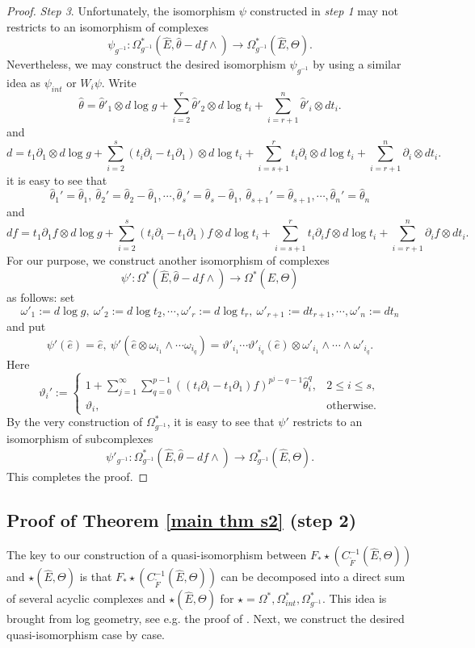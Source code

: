 \documentclass[12pt, a4paper]{article}
\begin{document}
\begin{proof}
\emph{Step 3}. Unfortunately, the isomorphism $\psi$ constructed in \emph{step 1} may not restricts to an isomorphism of complexes 
$$\psi_{g^{-1}}:\Omega^*_{g^{-1}}(\hat E,\hat\theta-df\wedge)\to\Omega^*_{g^{-1}}(\hat E,\Theta).$$
Nevertheless, we may construct the desired isomorphism $\psi_{g^{-1}}$ by using a similar idea as $\psi_{int}$ or $W_i\psi$. Write
$$
\hat\theta=\hat\theta'_1\otimes d\log g+\sum_{i=2}^r\hat\theta'_2\otimes d\log t_i+\sum_{i=r+1}^n\hat \theta'_i\otimes dt_i.
$$
and
$$
d=t_1\partial_1\otimes d\log g+\sum_{i=2}^s(t_i\partial_i-t_1\partial_1)\otimes d\log t_i+\sum_{i=s+1}^rt_i\partial_i\otimes d\log t_i+\sum_{i=r+1}^n\partial_i\otimes dt_i.
$$
it is easy to see that
$$
\hat\theta_1'=\hat\theta_1,~\hat\theta_2'=\hat\theta_2-\hat\theta_1,\cdots,\hat\theta_s'=\hat\theta_s-\hat\theta_1,~\hat\theta_{s+1}'=\hat\theta_{s+1},\cdots,\hat\theta_n'=\hat\theta_n
$$
and 
$$
df=t_1\partial_1f\otimes d\log g+\sum_{i=2}^s(t_i\partial_i-t_1\partial_1)f\otimes d\log t_i+\sum_{i=s+1}^rt_i\partial_if\otimes d\log t_i+\sum_{i=r+1}^n\partial_if\otimes dt_i.
$$
For our purpose, we construct another isomorphism of complexes 
$$
\psi':\Omega^*(\hat E,\hat\theta-df\wedge)\to\Omega^*(\hat E,\Theta) 
$$
as follows: set
$$
\omega'_1:=d\log g,~\omega'_2:=d\log t_2,\cdots,\omega'_r:=d\log t_r,~\omega'_{r+1}:=dt_{r+1},\cdots,\omega'_n:=dt_n
$$
and put
$$
\psi'(\hat e)=\hat e,~\psi'(\hat e\otimes\omega_{i_1}\wedge\cdots\omega_{i_q})=\vartheta'_{i_1}\cdots\vartheta'_{i_q}(\hat e)\otimes\omega'_{i_1}\wedge\cdots\wedge\omega'_{i_q}.
$$
Here 
$$
\vartheta_i':=\left\{
\begin{matrix}
1+\sum_{j=1}^\infty\sum_{q=0}^{p-1}((t_i\partial_i-t_1\partial_1) f)^{p^j-q-1}\hat\theta_i^q,&2\leq i\leq s,\\
\vartheta_i,&\mathrm{otherwise}.
\end{matrix}
\right.
$$
By the very construction of $\Omega^*_{g^{-1}}$, it is easy to see that $\psi'$ restricts to an isomorphism of subcomplexes 
$$
\psi'_{g^{-1}}:\Omega^*_{g^{-1}}(\hat E,\hat\theta-df\wedge)\to\Omega^*_{g^{-1}}(\hat E,\Theta).
$$
This completes the proof. 
\end{proof}


\subsection{Proof of Theorem \ref{main thm s2} (step 2)}

The key to our construction of a quasi-isomorphism between $F_*\star(C_{\tilde F}^{-1}(\hat E,\Theta))$ and $\star(\hat E,\Theta)$ is that $F_*\star(C_{\tilde F}^{-1}(\hat E,\Theta))$ can be decomposed into a direct sum of several acyclic complexes and $\star(\hat E,\Theta)$ for $\star=\Omega^*,\Omega^*_{int},\Omega^*_{g^{-1}}$. This idea is brought from log geometry, see e.g. the proof of \cite[Theorem (4.12)]{Kato}. Next, we construct the desired quasi-isomorphism case by case. 
\end{document}
